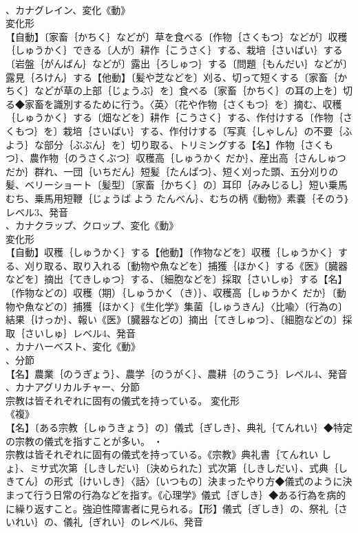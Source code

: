 \documentclass[8pt]{extreport}
\begin{document}
\begin{CJK}{UTF8}{min}
\\	、カナグレイン、変化《動》
\\	変化形 
\\	【自動】〔家畜｛かちく｝などが〕草を食べる〔作物｛さくもつ｝などが〕収穫｛しゅうかく｝できる〔人が〕耕作｛こうさく｝する、栽培｛さいばい｝する〔岩盤｛がんばん｝などが〕露出｛ろしゅつ｝する〔問題｛もんだい｝などが〕露見｛ろけん｝する【他動】〔髪や芝などを〕刈る、切って短くする〔家畜｛かちく｝などが草の上部｛じょうぶ｝を〕食べる〔家畜｛かちく｝の耳の上を〕切る◆家畜を識別するために行う。〈英〉〔花や作物｛さくもつ｝を〕摘む、収穫｛しゅうかく｝する〔畑などを〕耕作｛こうさく｝する、作付けする〔作物｛さくもつ｝を〕栽培｛さいばい｝する、作付けする〔写真｛しゃしん｝の不要｛ふよう｝な部分｛ぶぶん｝を〕切り取る、トリミングする【名】作物｛さくもつ｝、農作物｛のうさくぶつ｝収穫高｛しゅうかく だか｝、産出高｛さんしゅつだか｝群れ、一団｛いちだん｝短髪｛たんぱつ｝、短く刈った頭、五分刈りの髪、ベリーショート〔髪型〕〔家畜｛かちく｝の〕耳印｛みみじるし｝短い乗馬むち、乗馬用短鞭｛じょうば よう たんべん｝、むちの柄《動物》素嚢｛そのう｝レベル3、発音
\\	、カナクラップ、クロップ、変化《動》
\\	変化形 
\\	【自動】収穫｛しゅうかく｝する【他動】〔作物などを〕収穫｛しゅうかく｝する、刈り取る、取り入れる〔動物や魚などを〕捕獲｛ほかく｝する《医》〔臓器などを〕摘出｛てきしゅつ｝する、〔細胞などを〕採取｛さいしゅ｝する【名】〔作物などの〕収穫（期）｛しゅうかく（き）｝、収穫高｛しゅうかく だか｝〔動物や魚などの〕捕獲｛ほかく｝《生化学》集菌｛しゅうきん｝〈比喩〉〔行為の〕結果｛けっか｝、報い《医》〔臓器などの〕摘出｛てきしゅつ｝、〔細胞などの〕採取｛さいしゅ｝レベル4、発音
\\	、カナハーベスト、変化《動》
\\	、分節
\\	【名】農業｛のうぎょう｝、農学｛のうがく｝、農耕｛のうこう｝レベル4、発音
\\	、カナアグリカルチャー、分節
\\	宗教は皆それぞれに固有の儀式を持っている。	変化形 
\\	《複》
\\	【名】〔ある宗教｛しゅうきょう｝の〕儀式｛ぎしき｝、典礼｛てんれい｝◆特定の宗教の儀式を指すことが多い。 ・
\\	宗教は皆それぞれに固有の儀式を持っている。《宗教》典礼書｛てんれい しょ｝、ミサ式次第｛しきしだい｝〔決められた〕式次第｛しきしだい｝、式典｛しきてん｝の形式｛けいしき｝〈話〉〔いつもの〕決まったやり方◆儀式のように決まって行う日常の行為などを指す。《心理学》儀式｛ぎしき｝◆ある行為を病的に繰り返すこと。強迫性障害者に見られる。【形】儀式｛ぎしき｝の、祭礼｛さいれい｝の、儀礼｛ぎれい｝のレベル6、発音

\end{CJK}
\end{document}
